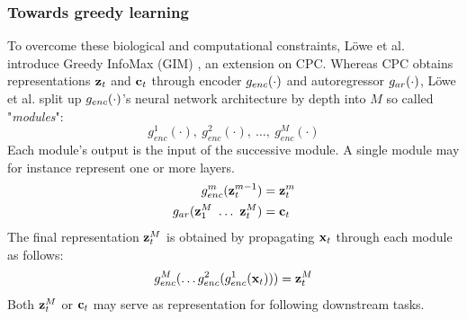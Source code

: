 		
	
\subsubsection{Towards greedy learning}	
		To overcome these biological and computational constraints, Löwe et al. introduce Greedy InfoMax (GIM) \cite{lowePuttingEndEndtoEnd2020}, an extension on CPC. Whereas CPC obtains representations $\mathbf{z}_t$ and $\mathbf{c}_t$ through encoder $g_{enc}(\cdot)$ and autoregressor $g_{ar}(\cdot)$, Löwe et al. split up $g_{enc}(\cdot)$'s neural network architecture by depth into $M$ so called "\textit{modules}": 
		$$g_{enc}^1(\cdot),~ g_{enc}^2(\cdot),~\dots,~g_{enc}^M(\cdot)$$ 
		Each module's output is the input of the successive module. A single module may for instance represent one or more layers.
		\begin{align*} %
			g_{enc}^m(\zt^{m-1}) &= \zt^m \\
			g_{ar}(\z_1^M ~ \dots ~ \zt^M) &= \ct
		\end{align*}
		The final representation $\mathbf{z}_t^M$ is obtained by propagating $\mathbf{x}_t$ through each module as follows:
		$$ g_{enc}^M ( \dots	g_{enc}^2(g_{enc}^1(\mathbf{x}_t))) = \mathbf{z}_t^M $$
		Both $\mathbf{z}_t^M$ or $\mathbf{c}_t$ may serve as representation for following downstream tasks.
	


